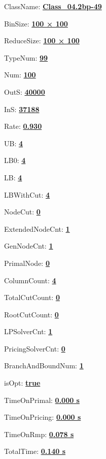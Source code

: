 \documentclass[11pt]{article}
\begin{document}
\pagestyle{empty}


ClassName: \underline{\textbf{Class_04.2bp-49}}
\par
BinSize: \underline{\textbf{100 × 100}}
\par
ReduceSize: \underline{\textbf{100 × 100}}
\par
TypeNum: \underline{\textbf{99}}
\par
Num: \underline{\textbf{100}}
\par
OutS: \underline{\textbf{40000}}
\par
InS: \underline{\textbf{37188}}
\par
Rate: \underline{\textbf{0.930}}
\par
UB: \underline{\textbf{4}}
\par
LB0: \underline{\textbf{4}}
\par
LB: \underline{\textbf{4}}
\par
LBWithCut: \underline{\textbf{4}}
\par
NodeCut: \underline{\textbf{0}}
\par
ExtendedNodeCnt: \underline{\textbf{1}}
\par
GenNodeCnt: \underline{\textbf{1}}
\par
PrimalNode: \underline{\textbf{0}}
\par
ColumnCount: \underline{\textbf{4}}
\par
TotalCutCount: \underline{\textbf{0}}
\par
RootCutCount: \underline{\textbf{0}}
\par
LPSolverCnt: \underline{\textbf{1}}
\par
PricingSolverCnt: \underline{\textbf{0}}
\par
BranchAndBoundNum: \underline{\textbf{1}}
\par
isOpt: \underline{\textbf{true}}
\par
TimeOnPrimal: \underline{\textbf{0.000 s}}
\par
TimeOnPricing: \underline{\textbf{0.000 s}}
\par
TimeOnRmp: \underline{\textbf{0.078 s}}
\par
TotalTime: \underline{\textbf{0.140 s}}
\par
\newpage
\end{document}
